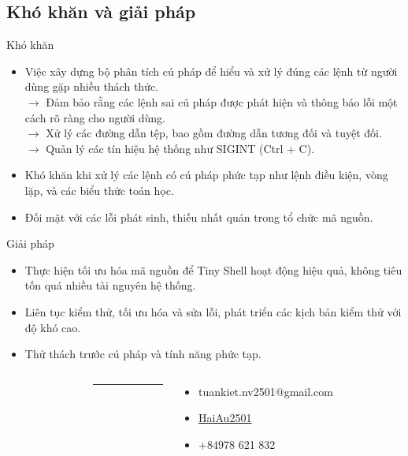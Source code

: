 \subsection{Khó khăn và giải pháp}
\begin{frame}{Khó khăn}
\begin{itemize}
    \item Việc xây dựng bộ phân tích cú pháp để hiểu và xử lý đúng các lệnh từ người dùng gặp nhiều thách thức.\\
    $\to$ Đảm bảo rằng các lệnh sai cú pháp được phát hiện và thông báo lỗi một cách rõ ràng cho người dùng.\\
    $\to$ Xử lý các đường dẫn tệp, bao gồm đường dẫn tương đối và tuyệt đối.\\
    $\to$ Quản lý các tín hiệu hệ thống như SIGINT (Ctrl + C).
    \item Khó khăn khi xử lý các lệnh có cú pháp phức tạp như lệnh điều kiện, vòng lặp, và các biểu thức toán học.
    \item Đối mặt với các lỗi phát sinh, thiếu nhất quán trong tổ chức mã nguồn.
\end{itemize}
\end{frame}

\begin{frame}{Giải pháp}
\begin{itemize}
    \item Thực hiện tối ưu hóa mã nguồn để Tiny Shell hoạt động hiệu quả, không tiêu tốn quá nhiều tài nguyên hệ thống.
    \item Liên tục kiểm thử, tối ưu hóa và sửa lỗi, phát triển các kịch bản kiểm thử với độ khó cao.
    \item Thử thách trước cú pháp và tính năng phức tạp.
\end{itemize}
\end{frame}

\begin{frame}
    \begin{columns}
        \begin{column}{0.45\textwidth}
            \centering
            \Large {}
        \end{column}
        \begin{column}{1 pt}
            \centering
            \textcolor{cyan}{\rule{1pt}{200pt}}
        \end{column}
        \begin{column}{0.45\textwidth}
            \begin{itemize}
                \item {} tuankiet.nv2501@gmail.com
                \item {} \href{https://github.com/HaiAu2501}{HaiAu2501}
                \item {} +84978 621 832
            \end{itemize}
        \end{column}
    \end{columns}
    
\end{frame}


